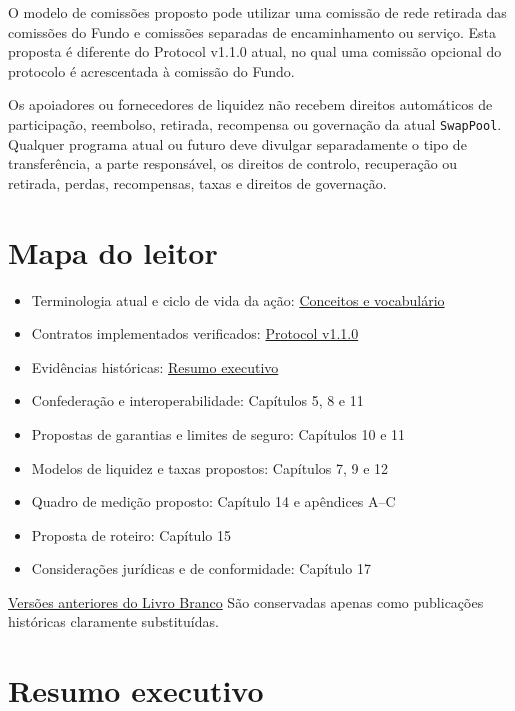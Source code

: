 \documentclass[11pt]{article}
\begin{document}
O modelo de comissões proposto pode utilizar uma comissão de rede retirada das comissões do Fundo e comissões separadas de encaminhamento ou serviço. Esta proposta é diferente do Protocol v1.1.0 atual, no qual uma comissão opcional do protocolo é acrescentada à comissão do Fundo.

Os apoiadores ou fornecedores de liquidez não recebem direitos automáticos de participação, reembolso, retirada, recompensa ou governação da atual \texttt{SwapPool}. Qualquer programa atual ou futuro deve divulgar separadamente o tipo de transferência, a parte responsável, os direitos de controlo, recuperação ou retirada, perdas, recompensas, taxas e direitos de governação.

\section*{Mapa do leitor}

\begin{itemize}[leftmargin=*]
\item Terminologia atual e ciclo de vida da ação: \href{https://docs.cosmolocal.credit/pt/introduction/concepts}{Conceitos e vocabulário}
\item Contratos implementados verificados: \href{https://docs.cosmolocal.credit/pt/protocol/overview}{Protocol v1.1.0}
\item Evidências históricas: \href{https://docs.cosmolocal.credit/pt/white-paper/executive-summary}{Resumo executivo}
\item Confederação e interoperabilidade: Capítulos 5, 8 e 11
\item Propostas de garantias e limites de seguro: Capítulos 10 e 11
\item Modelos de liquidez e taxas propostos: Capítulos 7, 9 e 12
\item Quadro de medição proposto: Capítulo 14 e apêndices A--C
\item Proposta de roteiro: Capítulo 15
\item Considerações jurídicas e de conformidade: Capítulo 17
\end{itemize}
\href{https://docs.cosmolocal.credit/pt/white-paper/archive}{Versões anteriores do Livro Branco} São conservadas apenas como publicações históricas claramente substituídas.

\section*{Resumo executivo}
\end{document}
